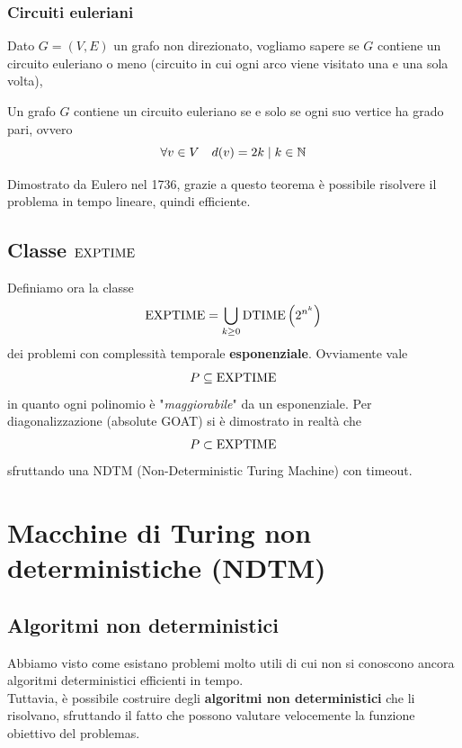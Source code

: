 \subsubsection{Circuiti euleriani}

Dato $G = (V,E)$ un grafo non direzionato, vogliamo sapere se $G$ contiene un circuito euleriano o meno (circuito in cui ogni arco viene visitato una e una sola volta),\\

\begin{theor}
	Un grafo $G$ contiene un circuito euleriano se e solo se ogni suo vertice ha grado pari, ovvero
	$$ \forall v \in V \quad d(v) = 2k \mid k \in \mathbb{N} $$
\end{theor}

Dimostrato da Eulero nel 1736, grazie a questo teorema è possibile risolvere il problema in tempo lineare, quindi efficiente.

\subsection{Classe $\text{EXPTIME}$}

Definiamo ora la classe
$$ \text{EXPTIME} = \bigcup_{k \geq 0} \text{DTIME} \left(2^{n^k}\right)$$
dei problemi con complessità temporale \textbf{esponenziale}. Ovviamente vale
$$ P \subseteq \text{EXPTIME} $$
in quanto ogni polinomio è "\textit{maggiorabile}" da un esponenziale. Per diagonalizzazione (absolute GOAT) si è dimostrato in realtà che
$$ P \subset \text{EXPTIME} $$
sfruttando una NDTM (Non-Deterministic Turing Machine) con timeout.

\section{Macchine di Turing non deterministiche (NDTM)}

\subsection{Algoritmi non deterministici}

Abbiamo visto come esistano problemi molto utili di cui non si conoscono ancora algoritmi deterministici efficienti in tempo.\\

Tuttavia, è possibile costruire degli \textbf{algoritmi non deterministici} che li risolvano, sfruttando il fatto che possono valutare velocemente la funzione obiettivo del problemas.\\

